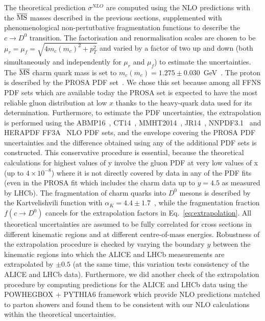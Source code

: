 \documentclass[12pt,a4paper]{article}
\newcommand{\msbar}{\ensuremath{\overline{\rm MS}}\xspace}
\newcommand{\dz}{\ensuremath{D^0}\xspace}
\begin{document}
The theoretical prediction $\sigma^{NLO}$ are computed using the NLO predictions with the \msbar masses described in the previous sections, supplemented with phenomenological non-pertutbative fragmentation functions to describe the $c \to \dz$ transition. The factorisation and renormalisation scales are chosen to be $\mu_r = \mu_f = \sqrt{4m_c(m_c)^2+p_T^2}$ and varied by a factor of two up and down (both simultaneously and independently for $\mu_r$ and $\mu_f$) to estimate the uncertainties. The \msbar charm quark mass is set to $m_c(m_c) = 1.275 \pm 0.030$~GeV~\cite{Tanabashi:2018oca}. The proton is described by the PROSA PDF set~\cite{Zenaiev:2015rfa}. We chose this set because among all FFNS PDF sets which are available today the PROSA set is expected to have the most reliable gluon distribution at low $x$ thanks to the heavy-quark data used for its determination. Furthermore, to estimate the PDF uncertainties, the extrapolation is performed using the ABMP16~\cite{Alekhin:2018pai}, CT14~\cite{Dulat:2015mca}, MMHT2014~\cite{Harland-Lang:2014zoa}, JR14~\cite{Jimenez-Delgado:2014twa}, NNPDF3.1~\cite{Ball:2017nwa} and HERAPDF FF3A~\cite{Abramowicz:2015mha} NLO PDF sets, and the envelope covering the PROSA PDF uncertainties and the difference obtained using any of the additional PDF sets is constructed. This conservative procedure is essential, because the theoretical calculations for highest values of y involve the gluon PDF at very low values of x (up to $4\times 10^{-8}$) where it is not directly covered by data in any of the PDF fits (even in the PROSA fit which includes the charm data up to $y = 4.5$ as measured by LHCb). The fragmentation of charm quarks into \dz mesons is described by the Kartvelishvili function with $\alpha_K = 4.4 \pm 1.7$~\cite{Zenaiev:2015rfa}, while the fragmentation fraction $f(c \to \dz)$ cancels for the extrapolation factors in Eq.~\ref{eq:extrapolation}. All theoretical uncertainties are assumed to be fully correlated for cross sections in different kinematic regions and at different centre-of-mass energies. Robustness of the extrapolation procedure is checked by varying the boundary $y$ between the kinematic regions into which the ALICE and LHCb measurements are extrapolated by $\pm 0.5$ (at the same time, this variation tests consistency of the ALICE and LHCb data). Furthermore, we did another check of the extrapolation procedure by computing predictions for the ALICE and LHCb data using the POWHEGBOX + PYTHIA6 framework which provide NLO predictions matched to parton showers and found them to be consistent with our NLO calculations within the theoretical uncertainties.
\end{document}
